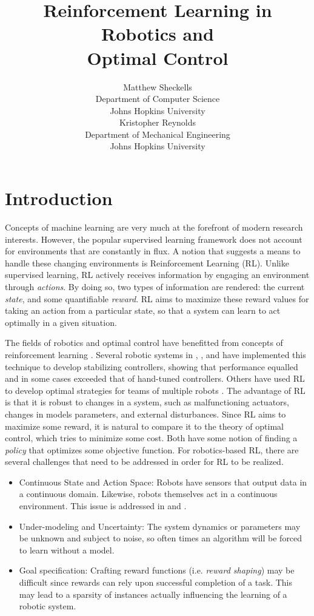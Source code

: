 \documentclass{article} %
\title{Reinforcement Learning in Robotics and  \\ Optimal Control}%
\author{
Matthew Sheckells\\
Department of Computer Science\\
Johns Hopkins University\\
\And
Kristopher Reynolds \\
Department of Mechanical Engineering\\
Johns Hopkins University\\
}
\begin{document}
\maketitle

\section{Introduction}
Concepts of machine learning are very much at the forefront of modern research interests. However, the popular supervised learning framework does not account for environments that are constantly in flux. A notion that suggests a means to handle these changing environments is Reinforcement Learning (RL). Unlike supervised learning, RL actively receives information by engaging an environment through \textit{actions}. By doing so, two types of information are rendered: the current \textit{state}, and some quantifiable \textit{reward}. RL aims to maximize these reward values for taking an action from a particular state, so that a system can learn to act optimally in a given situation.

The fields of robotics and optimal control have benefitted from concepts of reinforcement learning \cite{kaelbling_reinforcement_1996} \cite{kober_reinforcement_2013}. Several robotic systems in  \cite{bhasin_reinforcement_2011}, \cite{hester_rtmba:_2012}, and  \cite{kim_autonomous_2003} have implemented this technique to develop stabilizing controllers, showing that performance equalled and in some cases exceeded that of hand-tuned controllers. Others have used RL to develop optimal strategies for teams of multiple robots \cite{yang_multiagent_2004}.  The advantage of RL is that it is robust to changes in a system, such as malfunctioning actuators, changes in models parameters, and external disturbances. Since RL aims to maximize some reward, it is natural to compare it to the theory of optimal control, which tries to minimize some cost.  Both have some notion of finding a \textit{policy} that optimizes some objective function. For robotics-based RL, there are several challenges that need to be addressed in order for RL to be realized.
\begin{itemize}
\item Continuous State and Action Space: Robots have sensors that output data in a continuous domain.  Likewise, robots themselves act in a continuous environment. This issue is addressed in \cite{gaskett_thesis} and \cite{q_learning_navigation}.
\item Under-modeling and Uncertainty: The system dynamics or parameters may be unknown and subject to noise, so often times an algorithm will be forced to learn without a model.
\item Goal specification: Crafting reward functions (i.e. \textit{reward shaping}) may be difficult since rewards can rely upon successful completion of a task. This may lead to a sparsity of instances actually influencing the learning of a robotic system.
\end{itemize}
\end{document}
